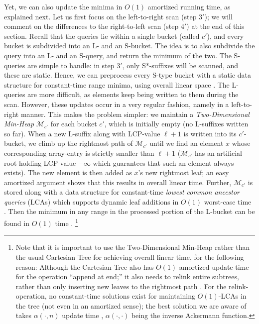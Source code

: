 \documentclass[11pt,onecolumn,final]{article} \usepackage[latin1]{inputenc}
\theoremstyle{plain}
\theoremstyle{remark}
\begin{document}
Yet, we can also update the minima in $O(1)$ amortized running time, as explained next. Let us first focus on the left-to-right scan (step 3$'$); we will comment on the differences to the right-to-left scan (step 4$'$) at the end of this section. Recall that the queries lie within a single bucket (called $c'$), and every bucket is subdivided into an L- and an S-bucket. The idea is to also subdivide the query into an L- and an S-query, and return the minimum of the two. The S-queries are simple to handle: in step 3$'$, only S*-suffixes will be scanned, and these are static. Hence, we can preprocess every S-type bucket with a static data structure for constant-time range minima, using overall linear space \cite[Thm.~1]{fischer10optimal}. The L-queries are more difficult, as elements keep being written to them during the scan. However, these updates occur in a very regular fashion, namely in a left-to-right manner. This makes the problem simpler: we maintain a \emph{Two-Dimensional Min-Heap} \cite[Def.~2]{fischer10optimal} $\mathcal{M}_{c'}$ for each bucket $c'$, which is initially empty (no L-suffixes written so far). When a new L-suffix along with LCP-value $\ell+1$ is written into its $c'$-bucket, we climb up the rightmost path of $\mathcal{M}_{c'}$ until we find an element $x$ whose corresponding array-entry is strictly smaller than $\ell+1$ ($\mathcal{M}_{c'}$ has an artificial root holding LCP-value $-\infty$ which guarantees that such an element always exists). The new element is then added as $x$'s new rightmost leaf; an easy amortized argument shows that this results in overall linear time. Further, $\mathcal{M}_{c'}$ is stored along with a data structure for constant-time \emph{lowest common ancestor queries} (LCAs) which supports dynamic leaf additions in $O(1)$ worst-case time \cite{cole05dynamic}. Then the minimum in any range in the processed portion of the L-bucket can be found in $O(1)$ time \cite[Lemma~2]{fischer10optimal}. \footnote{Note that it is important to use the Two-Dimensional Min-Heap rather than the usual Cartesian Tree for achieving overall linear time, for the following reason: Although the Cartesian Tree also has $O(1)$ amortized update-time for the operation ``append at end;'' it also needs to relink entire subtrees, rather than only inserting new leaves to the rightmost path \cite{gabow84scaling}. For the relink-operation, no constant-time solutions exist for maintaining $O(1)$-LCAs in the tree (not even in an amortized sense); the best solution we are aware of takes $\alpha(\cdot,n)$ update time \cite{harel84fast}, $\alpha(\cdot,\cdot)$ being the inverse Ackermann function.}
\end{document}
